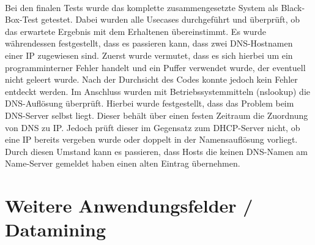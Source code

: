 \\
Bei den finalen Tests wurde das komplette zusammengesetzte System als Black-Box-Test getestet.
Dabei wurden alle Usecases durchgeführt und überprüft, ob das erwartete Ergebnis mit dem Erhaltenen übereinstimmt.
Es wurde währendessen festgestellt, dass es passieren kann, dass zwei DNS-Hostnamen einer IP zugewiesen sind. Zuerst wurde vermutet, dass es sich hierbei um ein programminterner Fehler handelt und ein Puffer verwendet wurde, der eventuell nicht geleert wurde. Nach der Durchsicht des Codes konnte jedoch kein Fehler entdeckt werden. Im Anschluss wurden mit Betriebssystemmitteln (nslookup) die DNS-Auflösung überprüft. Hierbei wurde festgestellt, dass das Problem beim DNS-Server selbst liegt. Dieser behält über einen festen Zeitraum die Zuordnung von DNS zu IP.
Jedoch prüft dieser im Gegensatz zum DHCP-Server nicht, ob eine IP bereits vergeben wurde oder doppelt in der Namensauflösung vorliegt. Durch diesen Umstand kann es passieren, dass Hosts die keinen DNS-Namen am Name-Server gemeldet haben einen alten Eintrag übernehmen.


\section{Weitere Anwendungsfelder / Datamining}
\label{sec:otherthoughts}

